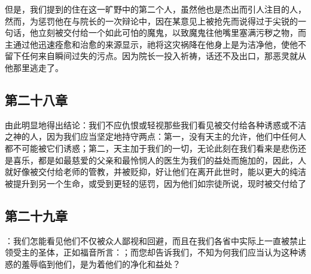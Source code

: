 \par

但是，我们提到的住在这一旷野中的第二个人，虽然他也是杰出而引人注目的人，然而，为惩罚他在与院长的一次辩论中，因在某意见上被抢先而说得过于尖锐的一句话，他立刻被交付给一个如此可怕的魔鬼，以致魔鬼往他嘴里塞满污秽之物，而主通过他迅速痊愈和治愈的来源显示，祂将这灾祸降在他身上是为洁净他，使他不留下任何来自瞬间过失的污点。因为院长一投入祈祷，话还不及出口，那恶灵就从他那里逃走了。\par


\subsection{第二十八章}

\par

由此明显地得出结论：我们不应仇恨或轻视那些我们看见被交付给各种诱惑或不洁之神的人，因为我们应当坚定地持守两点：第一，没有天主的允许，他们中任何人都不可能被它们诱惑；第二，天主加于我们的一切，无论此刻在我们看来是悲伤还是喜乐，都是如最慈爱的父亲和最怜悯人的医生为我们的益处而施加的，因此，人就好像被交付给老师的管教，并被贬抑，好让他们在离开此世时，能以更大的纯洁被提升到另一个生命，或受到更轻的惩罚，因为他们如宗徒所说，现时被交付给了\par


\subsection{第二十九章}

\par

：我们怎能看见他们不仅被众人鄙视和回避，而且在我们各省中实际上一直被禁止领受主的圣体，正如福音所言：；而您却告诉我们，不知为何我们应当认为这种诱惑的羞辱临到他们，是为着他们的净化和益处？\par


